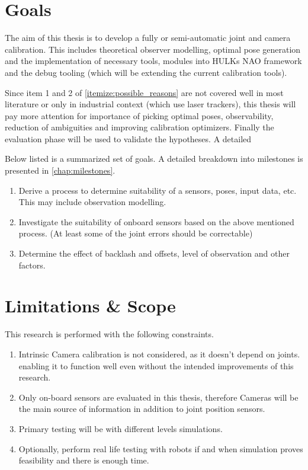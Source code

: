 \documentclass[english, printversion, nomenclature, notitle]{tuvisionthesis} %
\begin{document}
\section{Goals}

The aim of this thesis is to develop a fully or semi-automatic joint and camera calibration. This includes theoretical observer modelling, optimal  pose generation and the implementation of necessary tools, modules into HULKs NAO framework and the debug tooling (which will be extending the current calibration tools).

Since item 1 and 2 of \cref{itemize:possible_reasons} are not covered well in most literature or only in industrial context (which use laser trackers), this thesis will pay more attention for importance of picking optimal poses, observability, reduction of ambiguities and improving calibration optimizers. Finally the evaluation phase will be used to validate the hypotheses. A detailed 

Below listed is a summarized set of goals. A detailed breakdown into milestones is presented in \cref{chap:milestones}.

\begin{enumerate}
	\item Derive a process to determine suitability of a sensors, poses, input data, etc. This may include observation modelling.
	\item Investigate the suitability of onboard sensors based on the above mentioned process. (At least some of the joint errors should be correctable)
	\item Determine the effect of backlash and offsets, level of observation and other factors.
\end{enumerate}

\section{Limitations \& Scope}

This research is performed with the following constraints.

\begin{enumerate}
	\item Intrinsic Camera calibration is not considered, as it doesn't depend on joints. enabling it to function well even without the intended improvements of this research.
	\item Only on-board sensors are evaluated in this thesis, therefore Cameras will be the main source of information in addition to joint position sensors.
	\item Primary testing will be with different levels simulations.
	\item Optionally, perform real life testing with robots if and when simulation proves feasibility and there is enough time.
\end{enumerate}
\end{document}
